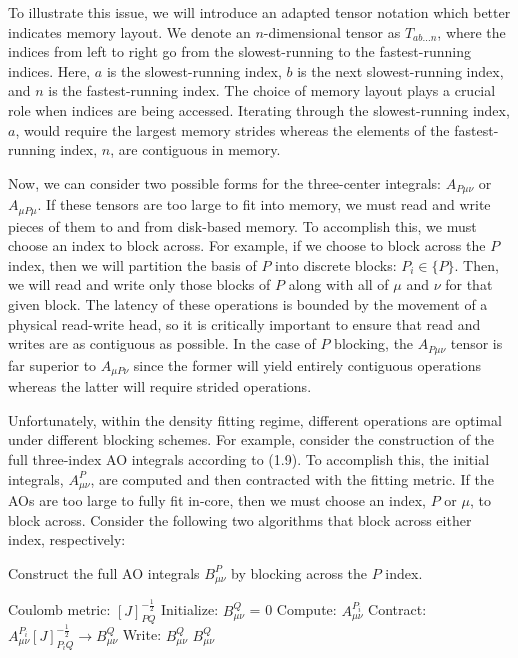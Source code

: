 To illustrate
this issue, we will introduce an adapted tensor notation which better indicates memory layout.
We denote an $n$-dimensional tensor as $T_{ab\hdots n}$, where the indices from left to right go from the slowest-running
to the fastest-running indices. Here, $a$ is the slowest-running index, $b$ is the next slowest-running
index, and $n$ is the fastest-running index. The choice of memory layout plays a crucial role when indices are being accessed.
Iterating through the slowest-running index, $a$, would require the largest memory strides whereas the elements 
of the fastest-running index, $n$, are contiguous in memory. 

Now, we can consider two possible forms for the three-center integrals: $A_{P\mu\nu}$ or $A_{\mu P\mu}$.
If these tensors are too large to fit into memory, we must read and write pieces of them to and from disk-based memory.
To accomplish this, we must choose an index to block across. 
For example, if we choose to block across the $P$ index, then we will partition the basis of $P$ into discrete blocks: $P_i \in \{P\}$.
Then, we will read and write only those blocks of $P$ along with all of $\mu$ and $\nu$ for that given block.
The latency of these operations is
bounded by the movement of a physical read-write head, so it is critically important to ensure that read and writes are as
contiguous as possible. In the case of $P$ blocking, the $A_{P\mu\nu}$ tensor is far superior to $A_{\mu P \nu}$ since the 
former will yield entirely contiguous operations whereas the latter will require strided operations. 

Unfortunately, within the density fitting regime, different operations are optimal under different blocking schemes. For example,
consider the construction of the full three-index AO integrals according to (1.9). To accomplish this, 
the initial integrals, $A_{\mu \nu}^P$, are computed and then contracted with the fitting metric. If the AOs are too large to fully 
fit in-core, then we must choose an index, $P$ or $\mu$, to block across. Consider the following two algorithms
that block across either index, respectively:

\begin{algorithm}[H]
\caption{Construct the full AO integrals $B_{\mu \nu}^P$ by blocking across the $P$ index.}
\begin{algorithmic}
\REQUIRE Coulomb metric: $[J]_{PQ}^{-\frac{1}{2}}$
\STATE Initialize: $B_{\mu \nu}^Q$ = 0
    \STATE Compute:  $A_{\mu \nu}^{P_i}$
    \STATE Contract: $A_{\mu \nu}^{P_i} [J]_{P_iQ}^{-\frac{1}{2}} \rightarrow B_{\mu \nu}^Q$
    \STATE Write:    $B_{\mu \nu}^Q$ 
\ENDFOR
\RETURN $B_{\mu \nu}^Q$
\end{algorithmic}
\end{algorithm}

